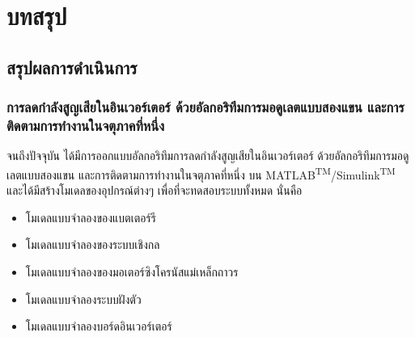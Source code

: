 \documentclass[11pt,a4paper]{article}
\begin{document}


\newpage
\section{บทสรุป}
\subsection{สรุปผลการดำเนินการ}

\subsubsection{การลดกำลังสูญเสียในอินเวอร์เตอร์ ด้วยอัลกอริทึมการมอดูเลตแบบสองแขน และการติดตามการทำงานในจตุภาคที่หนึ่ง}

จนถึงปัจจุบัน ได้มีการออกแบบอัลกอริทึมการลดกำลังสูญเสียในอินเวอร์เตอร์ ด้วยอัลกอริทึมการมอดูเลตแบบสองแขน และการติดตามการทำงานในจตุภาคที่หนึ่ง บน MATLAB\textsuperscript{TM}/Simulink\textsuperscript{TM} และได้มีสร้างโมเดลของอุปกรณ์ต่างๆ เพื่อที่จะทดสอบระบบทั้งหมด นั่นคือ

\begin{itemize}
    \item โมเดลแบบจำลองของแบตเตอร์รี
    \item โมเดลแบบจำลองของระบบเชิงกล
    \item โมเดลแบบจำลองของมอเตอร์ซิงโครนัสแม่เหล็กถาวร
    \item โมเดลแบบจำลองระบบฝังตัว
    \item โมเดลแบบจำลองบอร์ดอินเวอร์เตอร์
\end{itemize}
\end{document}
